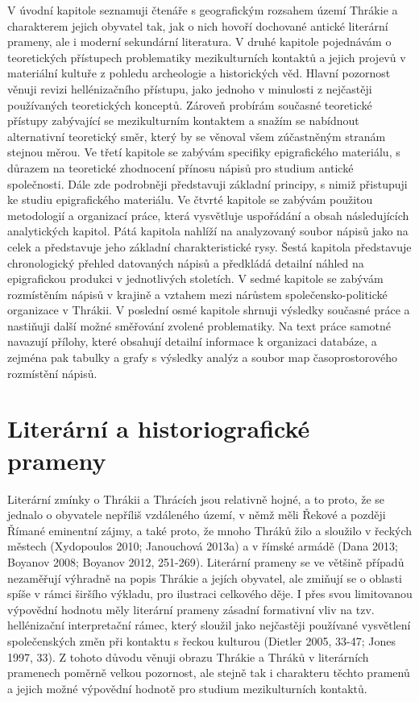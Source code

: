 V úvodní kapitole seznamuji čtenáře s geografickým rozsahem území Thrákie a charakterem jejich obyvatel tak, jak o nich hovoří dochované antické literární prameny, ale i moderní sekundární literatura. V druhé kapitole pojednávám o teoretických přístupech problematiky mezikulturních kontaktů a jejich projevů v materiální kultuře z pohledu archeologie a historických věd. Hlavní pozornost věnuji revizi hellénizačního přístupu, jako jednoho v minulosti z nejčastěji používaných teoretických konceptů. Zároveň probírám současné teoretické přístupy zabývající se mezikulturním kontaktem a snažím se nabídnout alternativní teoretický směr, který by se věnoval všem zúčastněným stranám stejnou měrou. Ve třetí kapitole se zabývám specifiky epigrafického materiálu, s důrazem na teoretické zhodnocení přínosu nápisů pro studium antické společnosti. Dále zde podrobněji představuji základní principy, s nimiž přistupuji ke studiu epigrafického materiálu. Ve čtvrté kapitole se zabývám použitou metodologií a organizací práce, která vysvětluje uspořádání a obsah následujících analytických kapitol. Pátá kapitola nahlíží na analyzovaný soubor nápisů jako na celek a představuje jeho základní charakteristické rysy. Šestá kapitola představuje chronologický přehled datovaných nápisů a předkládá detailní náhled na epigrafickou produkci v jednotlivých stoletích. V sedmé kapitole se zabývám rozmístěním nápisů v krajině a vztahem mezi nárůstem společensko-politické organizace v Thrákii. V poslední osmé kapitole shrnuji výsledky současné práce a nastiňuji další možné směřování zvolené problematiky. Na text práce samotné navazují přílohy, které obsahují detailní informace k organizaci databáze, a zejména pak tabulky a grafy s výsledky analýz a soubor map časoprostorového rozmístění nápisů.

\section[literární-a-historiografické-prameny]{Literární a historiografické prameny}

Literární zmínky o Thrákii a Thrácích jsou relativně hojné, a to proto, že se jednalo o obyvatele nepříliš vzdáleného území, v němž měli Řekové a později Římané eminentní zájmy, a také proto, že mnoho Thráků žilo a sloužilo v řeckých městech (Xydopoulos 2010; Janouchová 2013a) a v římské armádě (Dana 2013; Boyanov 2008; Boyanov 2012, 251-269). Literární prameny se ve většině případů nezaměřují výhradně na popis Thrákie a jejích obyvatel, ale zmiňují se o oblasti spíše v rámci širšího výkladu, pro ilustraci celkového děje. I přes svou limitovanou výpovědní hodnotu měly literární prameny zásadní formativní vliv na tzv. hellénizační interpretační rámec, který sloužil jako nejčastěji používané vysvětlení společenských změn při kontaktu s řeckou kulturou (Dietler 2005, 33-47; Jones 1997, 33). Z tohoto důvodu věnuji obrazu Thrákie a Thráků v literárních pramenech poměrně velkou pozornost, ale stejně tak i charakteru těchto pramenů a jejich možné výpovědní hodnotě pro studium mezikulturních kontaktů.

